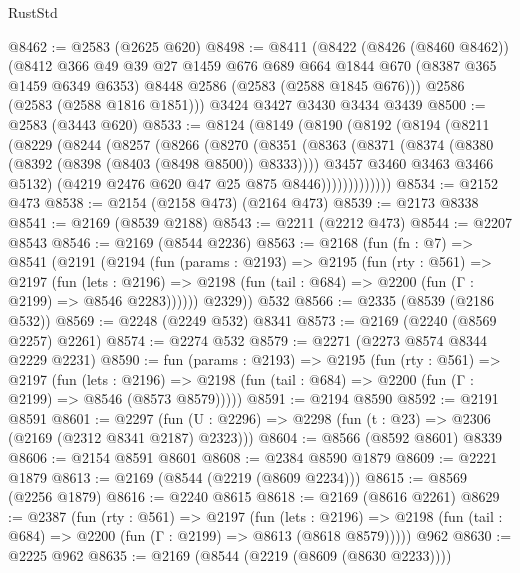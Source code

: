 \begin{lexlean}{RustStd}
\begin{coremodule}
{\begin{coremodule}
{{{{{{{{{{{{{{{@8462 := @2583 (@2625 @620)
@8498 := @8411
    (@8422
      (@8426 (@8460 @8462))
      (@8412
        @366
        @49
        @39
        @27
        @1459
        @676
        @689
        @664
        @1844
        @670
        (@8387 @365 @1459 @6349 @6353)
        @8448
        @2586
        (@2583 (@2588 @1845 @676)))
      @2586
      (@2583 (@2588 @1816 @1851)))
    @3424
    @3427
    @3430
    @3434
    @3439
@8500 := @2583 (@3443 @620)
@8533 := @8124
    (@8149
      (@8190
        (@8192
          (@8194
            (@8211
              (@8229
                (@8244
                  (@8257
                    (@8266
                      (@8270
                        (@8351
                          (@8363
                            (@8371
                              (@8374 (@8380 (@8392 (@8398 (@8403 (@8498 @8500)) @8333))))
                              @3457
                              @3460
                              @3463
                              @3466
                              @5132)
                            (@4219 @2476 @620 @47 @25 @875 @8446)))))))))))))
@8534 := @2152 @473
@8538 := @2154 (@2158 @473) (@2164 @473)
@8539 := @2173 @8338
@8541 := @2169 (@8539 @2188)
@8543 := @2211 (@2212 @473)
@8544 := @2207 @8543
@8546 := @2169 (@8544 @2236)
@8563 := @2168
    (fun (fn : @7) =>
    @8541
      (@2191
        (@2194
          (fun (params : @2193) =>
          @2195
            (fun (rty : @561) =>
            @2197
              (fun (lets : @2196) =>
              @2198 (fun (tail : @684) => @2200 (fun (Γ : @2199) => @8546 @2283))))))
        @2329))
    @532
@8566 := @2335 (@8539 (@2186 @532))
@8569 := @2248 (@2249 @532) @8341
@8573 := @2169 (@2240 (@8569 @2257) @2261)
@8574 := @2274 @532
@8579 := @2271 (@2273 @8574 @8344 @2229 @2231)
@8590 := fun (params : @2193) =>
  @2195
    (fun (rty : @561) =>
    @2197
      (fun (lets : @2196) =>
      @2198 (fun (tail : @684) => @2200 (fun (Γ : @2199) => @8546 (@8573 @8579)))))
@8591 := @2194 @8590
@8592 := @2191 @8591
@8601 := @2297 (fun (U : @2296) => @2298 (fun (t : @23) => @2306 (@2169 (@2312 @8341 @2187) @2323)))
@8604 := @8566 (@8592 @8601) @8339
@8606 := @2154 @8591 @8601
@8608 := @2384 @8590 @1879
@8609 := @2221 @1879
@8613 := @2169 (@8544 (@2219 (@8609 @2234)))
@8615 := @8569 (@2256 @1879)
@8616 := @2240 @8615
@8618 := @2169 (@8616 @2261)
@8629 := @2387
    (fun (rty : @561) =>
    @2197
      (fun (lets : @2196) =>
      @2198 (fun (tail : @684) => @2200 (fun (Γ : @2199) => @8613 (@8618 @8579)))))
    @962
@8630 := @2225 @962
@8635 := @2169 (@8544 (@2219 (@8609 (@8630 @2233))))
}}}}}}}}}}}}}}}
\end{coremodule}}
\end{coremodule}
\end{lexlean}
